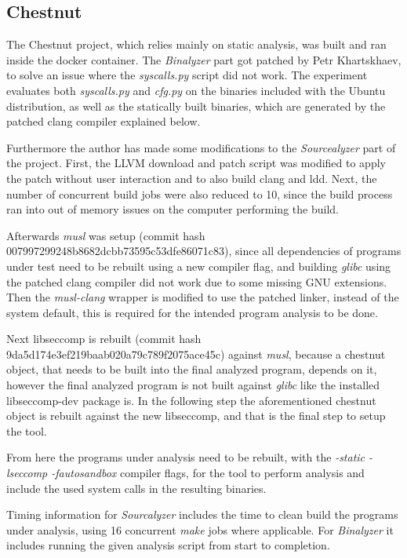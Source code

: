 \subsection {Chestnut}
The Chestnut \cite{ref_sp_1} project, which relies mainly on static analysis, was built and ran inside the docker container. The \textit{Binalyzer} part got patched by Petr Khartskhaev, to solve an issue where the \textit{syscalls.py} script did not work.
The experiment evaluates both \textit{syscalls.py} and \textit{cfg.py} on the binaries included with the Ubuntu distribution, as well as the statically built binaries, which are generated by the patched clang compiler explained below.

Furthermore the author has made some modifications to the \textit{Sourcealyzer} part of the project. First, the LLVM download and patch script was modified to apply the patch without user interaction and to also build clang and ldd.
Next, the number of concurrent build jobs were also reduced to 10, since the build process ran into out of memory issues on the computer performing the build.

Afterwards \textit{musl} was setup (commit hash 007997299248b8682dcbb73595c53dfe86071c83), since all dependencies of programs under test need to be rebuilt using a new compiler flag, and building \textit{glibc} using the patched clang compiler did not work due to some missing GNU extensions.
Then the \textit{musl-clang} wrapper is modified to use the patched linker, instead of the system default, this is required for the intended program analysis to be done.

Next libseccomp is rebuilt (commit hash 9da5d174e3ef219baab020a79c789f2075ace45c) against \textit{musl}, because a chestnut object, that needs to be built into the final analyzed program, depends on it, however the final analyzed program is not built against \textit{glibc} like the installed libseccomp-dev package is.
In the following step the aforementioned chestnut object is rebuilt against the new libseccomp, and that is the final step to setup the tool.

From here the programs under analysis need to be rebuilt, with the \textit{-static -lseccomp -fautosandbox} compiler flags, for the tool to perform analysis and include the used system calls in the resulting binaries.

Timing information for \textit{Sourcalyzer} includes the time to clean build the programs under analysis, using 16 concurrent \textit{make} jobs where applicable. For \textit{Binalyzer} it includes running the given analysis script from start to completion.

